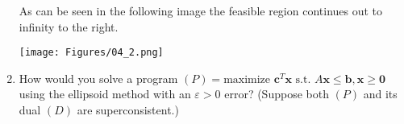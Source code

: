 \documentclass[11pt, oneside]{article}
\begin{document}
\begin{enumerate}
    As can be seen in the following image the feasible region continues
    out to infinity to the right.
    \begin{center}
      \texttt{[image: Figures/04\_2.png]}
    \end{center}

  \item %
    How would you solve a program 
    $(P)  = \text{maximize } \mathbf{c}^T\mathbf{x} \text{ s.t. } A\mathbf{x} \leq \mathbf{b}, \mathbf{x} \geq \mathbf{0}$
    using the ellipsoid method with an $\varepsilon > 0$ error?
    (Suppose both $(P)$ and its dual $(D)$ are superconsistent.)
\end{enumerate}
\end{document}
